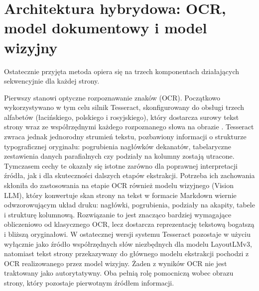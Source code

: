 
\section{Architektura hybrydowa: OCR, model dokumentowy i model wizyjny}\label{subsec:architektura}

Ostatecznie przyjęta metoda opiera się na trzech komponentach działających sekwencyjnie dla każdej strony.

Pierwszy stanowi optyczne rozpoznawanie znaków (OCR).
Początkowo wykorzystywano w tym celu silnik Tesseract, skonfigurowany do obsługi trzech alfabetów (łacińskiego, polskiego i rosyjskiego), który dostarcza surowy tekst strony wraz ze współrzędnymi każdego rozpoznanego słowa na obrazie \parencite{smith2007tesseract}.
Tesseract zwraca jednak jednorodny strumień tekstu, pozbawiony informacji o strukturze typograficznej oryginału: pogrubienia nagłówków dekanatów, tabelaryczne zestawienia danych parafialnych czy podziały na kolumny zostają utracone.
Tymczasem cechy te okazały się istotne zarówno dla poprawnej interpretacji źródła, jak i dla skuteczności dalszych etapów ekstrakcji.
Potrzeba ich zachowania skłoniła do zastosowania na etapie OCR również modelu wizyjnego (Vision LLM), który konwertuje skan strony na tekst w formacie Markdown wiernie odwzorowującym układ druku: nagłówki, pogrubienia, podziały na akapity, tabele i strukturę kolumnową.
Rozwiązanie to jest znacząco bardziej wymagające obliczeniowo od klasycznego OCR, lecz dostarcza reprezentację tekstową bogatszą i bliższą oryginałowi.
W ostatecznej wersji systemu Tesseract pozostaje w użyciu wyłącznie jako źródło współrzędnych słów niezbędnych dla modelu LayoutLMv3, natomiast tekst strony przekazywany do głównego modelu ekstrakcji pochodzi z OCR realizowanego przez model wizyjny.
Żaden z wyników OCR nie jest traktowany jako autorytatywny. Oba pełnią rolę pomocniczą wobec obrazu strony, który pozostaje pierwotnym źródłem informacji.

